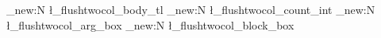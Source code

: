 


\newcommand{\ssi}{\ensuremath{\text{iff}}}
\newcommand{\ssid}{\ensuremath{\overset{\triangle}{\text{iff}}}}
\newcommand{\ssiidea}{\ensuremath{\overset{\star}{\text{iff}}}}


\newcommand{\ied}{\ensuremath{\overset{\triangle}{\text{i.e.}}}}
\newcommand{\idest}{\ensuremath{\text{i.e.}}}

\newcommand{\indep}{\mathrel{\perp\!\!\!\perp}}

\newcommand{\nicefunc}[5]{%
  \setlength{\arraycolsep}{3pt}%
  \begin{array}{rcl}
    #1 : #2 & \longrightarrow & #3 \\[3pt]
    #4 & \longmapsto & #5
  \end{array}%
}




\ExplSyntaxOn

\tl_new:N \l_flushtwocol_body_tl
\int_new:N \l_flushtwocol_count_int
\box_new:N \l_flushtwocol_arg_box
\box_new:N \l_flushtwocol_block_box

